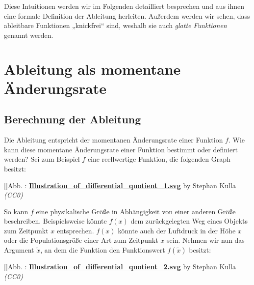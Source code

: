 \documentclass[fontsize=9pt,
               parskip=half-,
               DIV=14,
               listof=chapterentry,
               tocflat]{scrbook}
\newcounter{imagelabel}
\begin{document}
Diese Intuitionen werden wir im Folgenden detailliert besprechen und aus ihnen eine formale Definition der Ableitung herleiten. Außerdem werden wir sehen, dass ableitbare Funktionen „knickfrei“ sind, weshalb sie auch \emph{glatte Funktionen} genannt werden.

\section{Ableitung als momentane Änderungsrate}

\subsection{Berechnung der Ableitung}

Die Ableitung entspricht der momentanen Änderungsrate einer Funktion $f$. Wie kann diese momentane Änderungsrate einer Funktion bestimmt oder definiert werden? Sei zum Beispiel $f$ eine reellwertige Funktion, die folgenden Graph besitzt:

[]{Abb. : \protect\href{https://commons.wikimedia.org/wiki/File:Illustration_of_differential_quotient_1.svg}{\textbf{Illustration\allowbreak\_of\allowbreak\_differential\allowbreak\_quotient\allowbreak\_1.svg}} by Stephan Kulla \textit{(CC0)}}\begin{center}
\end{center}

So kann $f$ eine physikalische Größe in Abhängigkeit von einer anderen Größe beschreiben. Beispielsweise könnte $f(x)$ dem zurückgelegten Weg eines Objekts zum Zeitpunkt $x$ entsprechen. $f(x)$ könnte auch der Luftdruck in der Höhe $x$ oder die Populationsgröße einer Art zum Zeitpunkt $x$ sein. Nehmen wir nun das Argument ${\tilde {x}}$, an dem die Funktion den Funktionswert $f({\tilde {x}})$ besitzt:

[]{Abb. : \protect\href{https://commons.wikimedia.org/wiki/File:Illustration_of_differential_quotient_2.svg}{\textbf{Illustration\allowbreak\_of\allowbreak\_differential\allowbreak\_quotient\allowbreak\_2.svg}} by Stephan Kulla \textit{(CC0)}}\begin{center}
\end{center}
\end{document}

